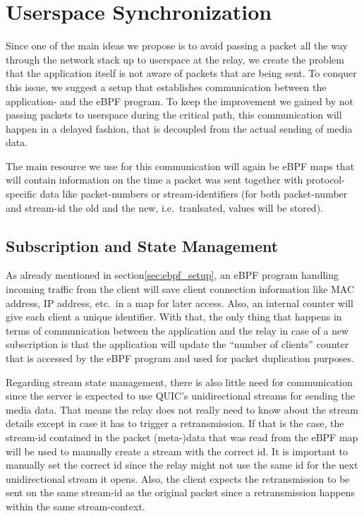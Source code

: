 \section{Userspace Synchronization}\label{sec:userspace_synchronization}

Since one of the main ideas we propose is to avoid passing a packet all the way
through the network stack up to userspace at the relay, we create the problem
that the application itself is not aware of packets that are being sent.
To conquer this issue, we suggest a setup that establishes communication
between the application- and the eBPF program.
To keep the improvement we gained by not passing packets to userspace during the 
critical path, this communication will happen in a delayed fashion, that is 
decoupled from the actual sending of media data.

The main resource we use for this communication will again be eBPF maps that
will contain information on the time a packet was sent together with protocol-specific 
data like packet-numbers or stream-identifiers (for both packet-number 
and stream-id the old and the new, i.e.~tranlsated, values will be stored).



\subsection{Subscription and State Management}
As already mentioned in section\nobreakspace\ref{sec:ebpf_setup}, an eBPF program handling incoming
traffic from the client will save client connection information like MAC address, IP 
address, etc.~in a map for later access.
Also, an internal counter will give each client a unique identifier. %
With that, the only thing that happens in terms of communication between the application 
and the relay in case of a new subscription is that the application will update the ``number 
of clients'' counter that is accessed by the eBPF program and used for packet duplication purposes.

Regarding stream state management, there is also little need for communication since the 
server is expected to use QUIC's unidirectional streams for sending the media data. 
That means the relay does not really need to know about the stream details except in case it 
has to trigger a retransmission.
If that is the case, the stream-id contained in the packet (meta-)data that was read from the eBPF map 
will be used to manually create a stream with the correct id.
It is important to manually set the correct id since the relay might not use the same id for the 
next unidirectional stream it opens.
Also, the client expects the retransmission to be sent on the same stream-id as the original packet
since a retransmission happens within the same stream-context.

